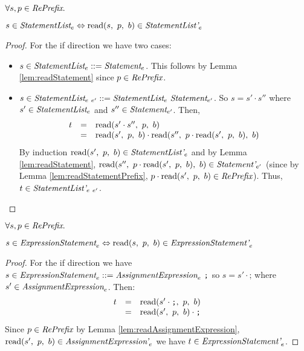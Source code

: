 \documentclass[preprint,10pt]{sigplanconf}
\begin{document}
\begin{lemma}\mbox{}

  \( \forall s, p \in \textit{RePrefix}. \)

  \( s \in \textit{StatementList}_{e} \Leftrightarrow 
  \textrm{read}(s,~p,~b) \in \textit{StatementList'}_{e} \)
\end{lemma}
\begin{proof}
  For the if direction we have two cases:
  \begin{itemize}
  \item \( s \in \textit{StatementList}_{e} ::= \textit{Statement}_{e} \).
    This follows by Lemma \ref{lem:readStatement} since \( p \in \textit{RePrefix} \).

  \item \( s \in \textit{StatementList}_{e~e'} ::=
    \textit{StatementList}_{e}~ \textit{Statement}_{e'} \). So 
    \( s = s' \cdot s'' \) where \( s' \in \textit{StatementList}_{e} \)
    and \( s'' \in \textit{Statement}_{e'} \). Then,
    \[
    \begin{array}{rcl}
      t &=& \textrm{read}(s' \cdot s'',~p,~b)
      \\
      &=& \textrm{read}(s',~p,~b) \cdot \textrm{read}(s'',~p \cdot \textrm{read}(s',~p,~b),~b)
    \end{array}
    \]
    By induction \( \textrm{read}(s',~p,~b) \in \textit{StatementList'}_{e} \)
    and by Lemma \ref{lem:readStatement}, \( \textrm{read}(s'',~p \cdot
      \textrm{read}(s',~p,~b),~b) \in \textit{Statement'}_{e'} \) (since by
    Lemma \ref{lem:readStatementPrefix}, \( p \cdot \textrm{read}(s',~p,~b)
    \in \textit{RePrefix} \)).
    Thus, \( t \in \textit{StatementList'}_{e~e'} \).
  \end{itemize}
\end{proof}

\begin{lemma}\mbox{}
  
  \( \forall s, p \in \textit{RePrefix}. \)

  \( s \in \textit{ExpressionStatement}_{e} \Leftrightarrow 
  \textrm{read}(s,~p,~b) \in \textit{ExpressionStatement'}_{e} \)
\end{lemma}
\begin{proof}
  For the if direction we have 
  \( s \in \textit{ExpressionStatement}_{e} ::=
  \textit{AssignmentExpression}_{e}~\texttt{;} \) so \( s = s' \cdot
  \texttt{;} \) where \( s' \in \textit{AssignmentExpression}_{e} \).
  Then:
  \[
  \begin{array}{rcl}
    t &=& \textrm{read}(s'\cdot \texttt{;},~p,~b)
    \\
    &=& \textrm{read}(s',~p,~b) \cdot \texttt{;}
  \end{array}
  \]
  Since \( p \in \textit{RePrefix} \) by Lemma
  \ref{lem:readAssignmentExpression}, \( \textrm{read}(s',~p,~b) \in
  \textit{AssignmentExpression'}_{e} \) we have \( t \in
  \textit{ExpressionStatement'}_{e} \).
\end{proof}
\end{document}
